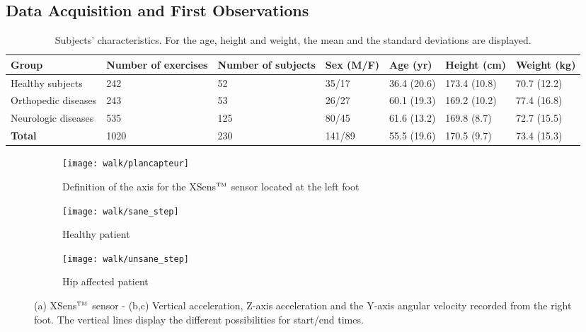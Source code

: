 \documentclass[../thesis.tex]{subfiles}
\begin{document}
\subsection{Data Acquisition and First Observations}


\begin{table*}[t]
\begin{center}
\begin{tabular}{|p{3cm}|p{1.5cm}|p{1.5cm}|p{1.5cm}|p{1.5cm}|p{1.5cm}|p{1.5cm}|}
%
\hline
 \textbf{Group} &\textbf{Number of exercises}&\textbf{Number of subjects}&\textbf{Sex (M/F)}&\textbf{Age (yr)}&\textbf{Height (cm)}&\textbf{Weight (kg)}\\
\hline
\hline
Healthy subjects & 242 & 52 & 35/17 & 36.4 (20.6) &  173.4 (10.8) &  70.7 (12.2)\\
\hline
Orthopedic diseases & 243 & 53 & 26/27 & 60.1 (19.3) &  169.2 (10.2) &  77.4 (16.8)\\
\hline
Neurologic diseases & 535 & 125 & 80/45 & 61.6 (13.2) &  169.8 (8.7) &  72.7 (15.5)\\
\hline
\hline
\textbf{Total} & 1020 & 230 & 141/89 & 55.5 (19.6) &  170.5 (9.7) &  73.4 (15.3)\\
\hline
\end{tabular}
\end{center}
\caption{Subjects' characteristics. For the age, height and weight, the mean and the standard deviations are displayed.}\label{subjects}
\end{table*}



\begin{figure*}[th]
\centering
\begin{subfigure}[b]{0.25\textwidth}
	\texttt{[image: walk/plancapteur]}
	\caption{ Definition of the axis for the XSens$^{\mbox{\tiny TM}}$ sensor located at the left foot}
	\label{capteurs}
\end{subfigure}
\hfill
\begin{subfigure}[b]{0.35\textwidth}
	\texttt{[image: walk/sane\_step]}
	\caption{Healthy patient}
	\label{fig:sain}
\end{subfigure}%
\hfill
\begin{subfigure}[b]{0.35\textwidth}
    \texttt{[image: walk/unsane\_step]}
    \caption{Hip affected patient}
    \label{fig:atteint}
\end{subfigure}
\caption{(a) XSens$^{\mbox{\tiny TM}}$ sensor - (b,c) Vertical acceleration, Z-axis acceleration and the Y-axis angular velocity recorded from the right foot. The vertical lines display the different possibilities for start/end times.}\label{patientSain}
\end{figure*}
\end{document}
